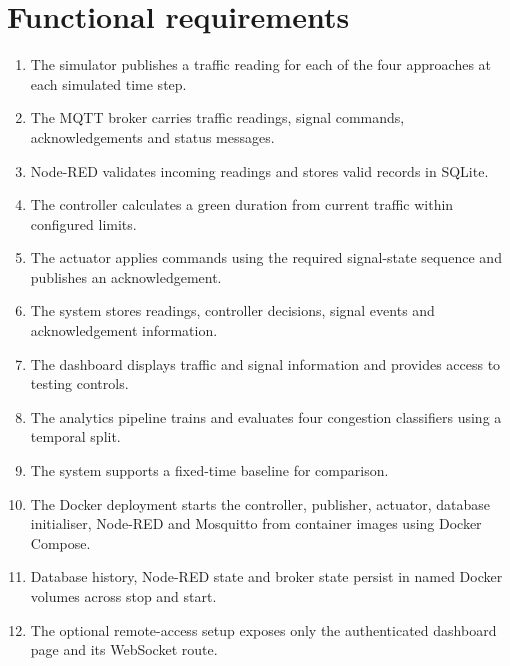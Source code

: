 \documentclass[12pt,a4paper,oneside]{report}
\begin{document}
\section{Functional requirements}
\begin{enumerate}
  \item The simulator publishes a traffic reading for each of the four approaches at each simulated time step.
  \item The MQTT broker carries traffic readings, signal commands, acknowledgements and status messages.
  \item Node-RED validates incoming readings and stores valid records in SQLite.
  \item The controller calculates a green duration from current traffic within configured limits.
  \item The actuator applies commands using the required signal-state sequence and publishes an acknowledgement.
  \item The system stores readings, controller decisions, signal events and acknowledgement information.
  \item The dashboard displays traffic and signal information and provides access to testing controls.
  \item The analytics pipeline trains and evaluates four congestion classifiers using a temporal split.
  \item The system supports a fixed-time baseline for comparison.
  \item The Docker deployment starts the controller, publisher, actuator, database initialiser, Node-RED and Mosquitto from container images using Docker Compose.
  \item Database history, Node-RED state and broker state persist in named Docker volumes across stop and start.
  \item The optional remote-access setup exposes only the authenticated dashboard page and its WebSocket route.
\end{enumerate}
\end{document}
